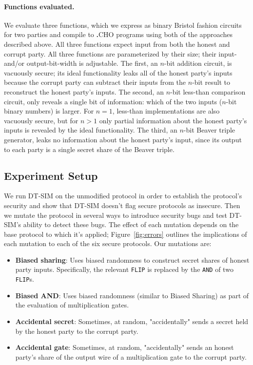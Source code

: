 \documentclass[acmlarge, manuscript, screen, review, anonymous, table]{acmart}
\newcommand{\inlinecode}[2][cho]{\lstinline[language=#1]{#2}}
\newcommand{\langname}{\textsc{\textbf{.}CHO}\xspace}
\newcommand{\toolname}{\textsc{DT-SIM}\xspace}
\begin{document}
\paragraph{Functions evaluated.}
We evaluate three functions, which we express as binary Bristol fashion circuits~\cite{bristol_circuits_website} for two parties
and compile to \langname programs using both of the approaches described above.
All three functions expect input from both the honest and corrupt party.
All three functions are parameterized by their size; their input- and/or output-bit-width is adjustable.
The first, an $n$-bit addition circuit, is vacuously secure;
its ideal functionality leaks all of the honest party's inputs
because the corrupt party can subtract their inputs from the $n$-bit result to reconstruct the honest party's inputs.
The second, an $n$-bit less-than comparison circuit,
only reveals a single bit of information:
which of the two inputs ($n$-bit binary numbers) is larger.
For $n=1$, less-than implementations are also vacuously secure,
but for $n>1$ only partial information about the honest party's inputs is revealed by the ideal functionality.
The third, an $n$-bit Beaver triple generator, leaks no information about the honest party's input,
since its output to each party is a single secret share of the Beaver triple.



\subsection{Experiment Setup}
\label{sec:e2-experiment-setup}

We run \toolname on the unmodified protocol in order to establish the protocol's security
and show that \toolname doesn't flag secure protocols as insecure.
Then we mutate the protocol in several ways to introduce security bugs and test \toolname's ability to detect these bugs.
The effect of each mutation depends on the base protocol to which it's applied;
Figure~\ref{fig:errors} outlines the implications of each mutation to each of the six secure protocols.
Our mutations are:
%
\begin{itemize}
\item \textbf{Biased sharing}: Uses biased randomness to construct secret shares of honest party inputs.
    Specifically, the relevant \inlinecode{FLIP} is replaced by the \inlinecode{AND} of two \inlinecode{FLIP}s.
\item \textbf{Biased AND}: Uses biased randomness (similar to Biased Sharing) as part of the evaluation of multiplication gates.
\item \textbf{Accidental secret}: Sometimes, at random, "accidentally" sends a secret held by the honest party to the corrupt party.
\item \textbf{Accidental gate}: Sometimes, at random, "accidentally" sends an honest party's share of the output wire
    of a multiplication gate to the corrupt party.
\end{itemize}
\end{document}
